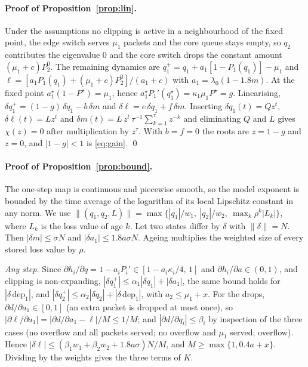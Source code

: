 \documentclass[11pt,a4paper]{article}
\begin{document}
\paragraph{Proof of Proposition~\ref{prop:lin}.}
Under the assumptions no clipping is active in a neighbourhood of the fixed point, the edge switch serves $\mu_1$ packets and the core queue stays empty, so $q_2$ contributes the eigenvalue $0$ and the core switch drops the constant amount $(\mu_1+c)P_2^0$. The remaining dynamics are $q_1^+=q_1+a_1[1-P_1(q_1)]-\mu_1$ and $\ell=[a_1P_1(q_1)+(\mu_1+c)P_2^0]/(a_1+c)$ with $a_1=\lambda_0(1-1.8m)$. At the fixed point $a_1^\star(1-P^\star)=\mu_1$, hence $a_1^\star P_1'(q_1^\star)=\kappa_1\mu_1P^\star=g$. Linearising,
$\delta q_1^+=(1-g)\,\delta q_1-b\,\delta m$ and $\delta\ell=e\,\delta q_1+f\,\delta m$. Inserting $\delta q_1(t)=Qz^t$, $\delta\ell(t)=Lz^t$ and $\delta m(t)=L\,z^t\,\tau^{-1}\sum_{k=1}^{\tau}z^{-k}$ and eliminating $Q$ and $L$ gives $\chi(z)=0$ after multiplication by $z^\tau$. With $b=f=0$ the roots are $z=1-g$ and $z=0$, and $|1-g|<1$ is \eqref{eq:gain}. \qed

\paragraph{Proof of Proposition~\ref{prop:bound}.}
The one-step map is continuous and piecewise smooth, so the model exponent is bounded by the time average of the logarithm of its local Lipschitz constant in any norm. We use $\|(q_1,q_2,L)\|=\max\{|q_1|/w_1,\ |q_2|/w_2,\ \max_k\rho^{k}|L_k|\}$, where $L_k$ is the loss value of age $k$. Let two states differ by $\delta$ with $\|\delta\|=N$. Then $|\delta m|\le\sigma N$ and $|\delta a_1|\le1.8a\sigma N$. Ageing multiplies the weighted size of every stored loss value by $\rho$.

\emph{Any step.} Since $\partial h_i/\partial q=1-a_iP_i'\in[1-a_i\kappa_i/4,\,1]$ and $\partial h_i/\partial a\in(0,1)$, and clipping is non-expanding, $|\delta q_1^+|\le\alpha_1|\delta q_1|+|\delta a_1|$, the same bound holds for $|\delta\,\mathrm{dep}_1|$, and $|\delta q_2^+|\le\alpha_2|\delta q_2|+|\delta\,\mathrm{dep}_1|$, with $a_2\le\mu_1+x$. For the drops, $\partial d/\partial a_1\in[0,1]$ (an extra packet is dropped at most once), so $|\partial\ell/\partial a_1|=|\partial d/\partial a_1-\ell|/M\le1/M$; and $|\partial d/\partial q_i|\le\beta_i$ by inspection of the three cases (no overflow and all packets served; no overflow and $\mu_1$ served; overflow). Hence $|\delta\ell|\le(\beta_1w_1+\beta_2w_2+1.8a\sigma)N/M$, and $M\ge\max\{1,0.4a+x\}$. Dividing by the weights gives the three terms of $K$.
\end{document}
